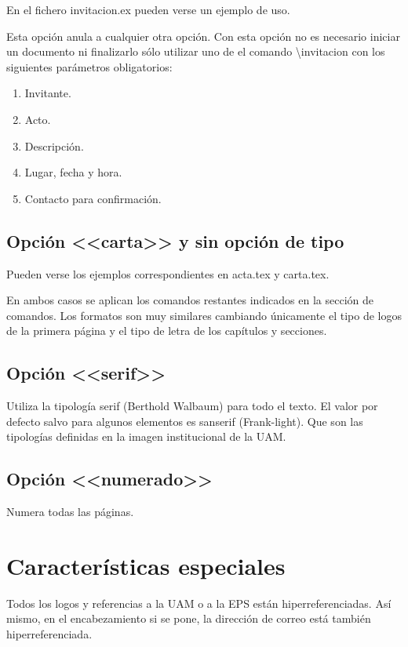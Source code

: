 \documentclass[numerado,carta]{plantillasEPS} %
\begin{document}
En el fichero invitacion.ex pueden verse un ejemplo de uso. 

Esta opción anula a cualquier otra opción. Con esta opción no es necesario iniciar un documento ni finalizarlo sólo utilizar uno de el comando {\textbackslash}invitacion con los siguientes parámetros obligatorios:
\begin{enumerate}
    \item Invitante.
    \item Acto.
    \item Descripción.
    \item Lugar, fecha y hora.
    \item Contacto para confirmación.
\end{enumerate}

\subsection{Opción <<carta>> y sin opción de tipo}
    Pueden verse los ejemplos correspondientes en acta.tex y carta.tex.
    
    En ambos casos se aplican los comandos restantes indicados en la sección de comandos. Los formatos son muy similares cambiando únicamente el tipo de logos de la primera página y el tipo de letra de los capítulos y secciones.

\subsection{Opción <<serif>>}
Utiliza la tipología serif (Berthold Walbaum) para todo el texto. El valor por defecto salvo para algunos elementos es sanserif (Frank-light). Que son las tipologías definidas en la imagen institucional de la UAM.

\subsection{Opción <<numerado>>}
Numera todas las páginas.

\section{Características especiales}

Todos los logos y referencias a la UAM o a la EPS están hiperreferenciadas. Así mismo, en el encabezamiento si se pone, la dirección de correo está también hiperreferenciada.
\end{document}
